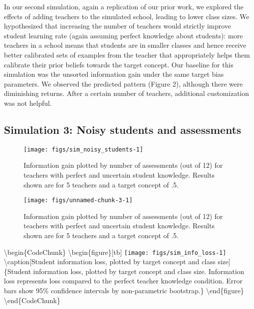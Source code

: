 \documentclass[10pt, letterpaper]{article}
\newenvironment{CodeChunk}{}{}
\begin{document}
In our second simulation, again a replication of our prior work, we
explored the effects of adding teachers to the simulated school, leading
to lower class sizes. We hypothesized that increasing the number of
teachers would strictly improve student learning rate (again assuming
perfect knowledge about students): more teachers in a school means that
students are in smaller classes and hence receive better calibrated sets
of examples from the teacher that appropriately helps them calibrate
their prior beliefs towards the target concept. Our baseline for this
simulation was the unsorted information gain under the same target bias
parameters. We observed the predicted pattern (Figure 2), although there
were diminishing returns. After a certain number of teachers, additional
customization was not helpful.

\subsection{Simulation 3: Noisy students and
assessments}\label{simulation-3-noisy-students-and-assessments}

\begin{CodeChunk}
\begin{figure}[tb]
\texttt{[image: figs/sim\_noisy\_students-1]} \caption[Information gain plotted by number of assessments (out of 12) for teachers with perfect and uncertain student knowledge]{Information gain plotted by number of assessments (out of 12) for teachers with perfect and uncertain student knowledge. Results shown are for 5 teachers and a target concept of .5.}\label{fig:sim_noisy_students}
\end{figure}
\end{CodeChunk}

\begin{CodeChunk}
\begin{figure}[tb]
\texttt{[image: figs/unnamed-chunk-3-1]} \caption[Information gain plotted by number of assessments (out of 12) for teachers with perfect and uncertain student knowledge]{Information gain plotted by number of assessments (out of 12) for teachers with perfect and uncertain student knowledge. Results shown are for 5 teachers and a target concept of .5.}\label{fig:unnamed-chunk-3}
\end{figure}
\end{CodeChunk}

\textbackslash{}begin\{CodeChunk\}
\textbackslash{}begin\{figure\}{[}tb{]}
\texttt{[image: figs/sim\_info\_loss-1]}
\textbackslash{}caption{[}Student information loss, plotted by target
concept and class size{]}\{Student information loss, plotted by target
concept and class size. Information loss represents loss compared to the
perfect teacher knowledge condition. Error bars show 95\% confidence
intervals by non-parametric bootstrap.\}\label{fig:sim_info_loss}
\textbackslash{}end\{figure\} \textbackslash{}end\{CodeChunk\}
\end{document}

